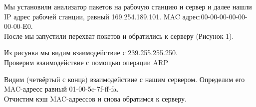 \documentclass[a4paper,12pt]{article}
\begin{document}
Мы установили анализатор пакетов на рабочую станцию и сервер и далее нашли IP 
адрес рабочей станции, равный 169.254.189.101. MAC адрес:00-00-00-00-00-00-00-E0.\\
После мы запустили перехват покетов и обратились к серверу (Рисунок 1).
\begin{figure}[H]
\end{figure}

Из рисунка мы видим взаимодействие с 239.255.255.250.\\
Проверим взаимодействие с помощью операции ARP 
\begin{figure}[H]
\end{figure}
Видим (четвёртый с конца) взаимодействие с нашим сервером.
Определим его MAC-адресс равный 01-00-5e-7f-ff-fa.\\

Отчистим кэш MAC-адрессов и снова обратимся к серверу.
\end{document}
